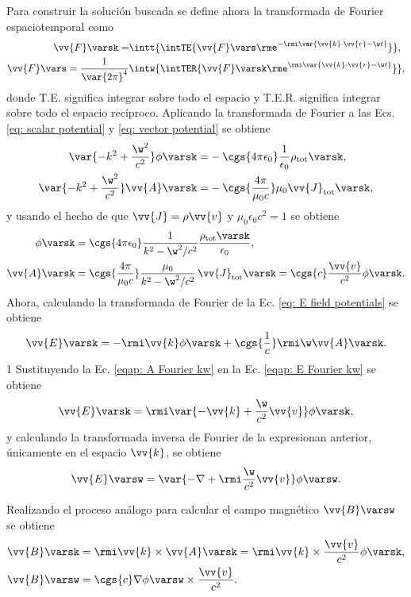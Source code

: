 Para construir la solución buscada se define ahora la transformada de Fourier espaciotemporal como
\begin{align}
\vv{F}\varsk = &\intt{\intTE{ \vv{F}\vars \rme^{-\rmi \var{\vv{k}\cdot\vv{r}-\w t}} }},\nonumber \\
\vv{F}\vars = \frac{1}{\var{2\pi}^4}&\intw{\intTER{ \vv{F}\varsk \rme^{\rmi\var{\vv{k}\cdot\vv{r}-\w t}} }},
\end{align}
donde T.E. significa integrar sobre todo el espacio y T.E.R. significa integrar sobre todo el espacio recíproco. Aplicando la transformada de Fourier a las Ecs. \eqref{eq: scalar potential} y \eqref{eq: vector potential} se obtiene 
\begin{align}
\var{-k^2+\frac{\w^2}{c^2}}\phi\varsk =& -\cgs{4\pi\epsilon_0}\frac{1}{\epsilon_0}\rho_{\text{tot}}\varsk, \\
\var{-k^2+\frac{\w^2}{c^2}}\vv{A}\varsk =& - \cgs{\frac{4\pi}{\mu_0 c}}\mu_0\vv{J}_{\text{tot}}\varsk, 
\end{align}
y usando el hecho de que $\vv{J} = \rho \vv{v}$ y $\mu_0 \epsilon_0 c^2 = 1$ se obtiene
\begin{align}
\phi\varsk &= \cgs{4\pi\epsilon_0}\frac{1}{k^2-\w^2/c^2} \frac{\rho_{\rm tot}\varsk}{\epsilon_0}, \label{eqap: phi Fourier kw} \\
\vv{A}\varsk &= \cgs{\frac{4\pi}{\mu_0 c}}\frac{\mu_0}{k^2-\w^2/c^2}\,\vv{J}_{\text{tot}}\varsk = \cgs{c}\frac{\vv{v}}{c^2}\phi\varsk. \label{eqap: A Fourier kw}
\end{align}
Ahora, calculando la transformada de Fourier de la Ec. \eqref{eq: E field potentials} se obtiene 
\begin{equation}
\vv{E}\varsk = - \rmi \vv{k} \phi\varsk + \cgs{\frac{1}{c}}\rmi \w \vv{A}\varsk \label{eqap: E Fourier kw}.
\end{equation}1
Sustituyendo la Ec. \eqref{eqap: A Fourier kw} en la Ec. \eqref{eqap: E Fourier kw} se obtiene
\begin{equation}
\vv{E}\varsk = \rmi \var{-\vv{k}+\frac{\w}{c^2}\vv{v}}\phi\varsk, 
\end{equation}
y calculando la transformada inversa de Fourier de la expresionan anterior, únicamente en el espacio $\vv{k}$, se obtiene
\begin{equation}
\vv{E}\varsw = \var{-\nabla+\rmi \frac{\w}{c^2}\vv{v}}\phi\varsw.
\end{equation}

Realizando el proceso análogo para calcular el campo magnético $\vv{B}\varsw$ se obtiene
\begin{align}
\vv{B}\varsk &= \rmi \vv{k}\times\vv{A}\varsk = \rmi \vv{k}\times\frac{\vv{v}}{c^2}\phi\varsk,\\
\vv{B}\varsw &= \cgs{c}\nabla \phi\varsw\times\frac{\vv{v}}{c^2}.
\end{align}

